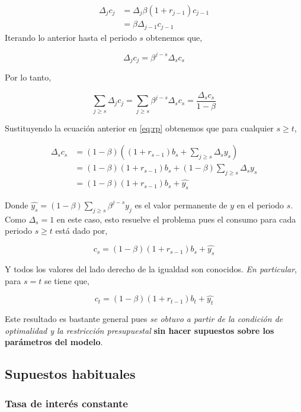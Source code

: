 \documentclass[]{article}
\begin{document}
\[
\begin{align}
\Delta_jc_j &= \Delta_j \beta(1+r_{j-1}) c_{j-1} \\
&= \beta \Delta_{j-1}c_{j-1}
\end{align}
\] Iterando lo anterior hasta el periodo \(s\) obtenemos que,

\[
\Delta_j c_j = \beta^{j-s} \Delta_s c_s
\]

Por lo tanto,

\[
\sum_{j \geq s} \Delta_j c_j = \sum_{j\geq s} \beta^{j-s} \Delta_s c_s = \frac{\Delta_s c_s}{1-\beta}
\]

Sustituyendo la ecuación anterior en \eqref{eq:rp} obtenemos que para
cualquier \(s \geq t\),

\[
\begin{align}
\Delta_s c_s &= (1-\beta)((1+r_{s-1})b_s + \sum_{j\geq s}\Delta_s y_s) \\
&= (1-\beta)(1+r_{s-1})b_s + (1-\beta)\sum_{j\geq s}\Delta_s y_s \\
&= (1-\beta)(1+r_{s-1})b_s + \hat{y_s}
\end{align}
\]

Donde \(\hat{y_s} = (1- \beta)\sum_{j\geq s} \beta^{j-s}y_j\) es el
valor permanente de \(y\) en el periodo \(s\). Como \(\Delta_s = 1\) en
este caso, esto resuelve el problema pues el consumo para cada periodo
\(s \geq t\) está dado por,

\[
c_s = (1-\beta)(1+r_{s-1})b_s +\hat{y_s}
\]

Y todos los valores del lado derecho de la igualdad son conocidos.
\emph{En particular}, para \(s = t\) se tiene que,

\[
\begin{equation}
c_t = (1-\beta)(1+r_{t-1})b_t + \hat{y_t}
\label{eq:cons}
\end{equation}
\]

Este resultado es bastante general pues \emph{se obtuvo a partir de la
condición de optimalidad y la restricción presupuestal} \textbf{sin
hacer supuestos sobre los parámetros del modelo}.

\subsection{Supuestos habituales}\label{supuestos-habituales}

\subsubsection{Tasa de interés
constante}\label{tasa-de-interes-constante}
\end{document}
